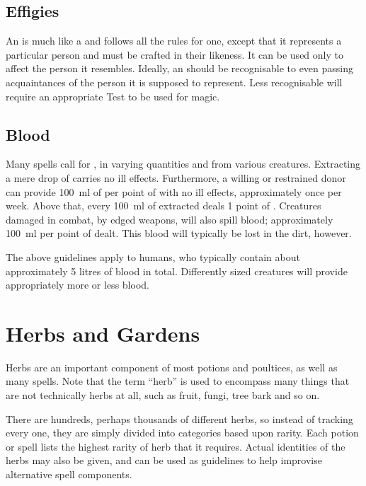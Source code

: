 \subsection{Effigies}

An  is much like a  and follows all the rules for one, except that it represents a particular person and must be crafted in their likeness.
It can be used only to affect the person it resembles.
Ideally, an  should be recognisable to even passing acquaintances of the person it is supposed to represent.
Less recognisable  will require an appropriate Test to be used for magic.

\subsection{Blood}

Many spells call for , in varying quantities and from various creatures.
Extracting a mere drop of  carries no ill effects.
Furthermore, a willing or restrained donor can provide \SI{100}{\milli\litre} of  per point of  with no ill effects, approximately once per week.
Above that, every \SI{100}{\milli\litre} of  extracted deals 1 point of {\damage}.
Creatures damaged in combat, by edged weapons, will also spill blood; approximately \SI{100}{\milli\litre} per point of {\damage} dealt.
This blood will typically be lost in the dirt, however.

The above guidelines apply to humans, who typically contain about approximately 5 litres of blood in total.
Differently sized creatures will provide appropriately more or less blood.


\section{Herbs and Gardens}

Herbs are an important component of most potions and poultices, as well as many spells.
Note that the term ``herb'' is used to encompass many things that are not technically herbs at all, such as fruit, fungi, tree bark and so on.

There are hundreds, perhaps thousands of different herbs, so instead of tracking every one, they are simply divided into categories based upon rarity.
Each potion or spell lists the highest rarity of herb that it requires.
Actual identities of the herbs may also be given, and can be used as guidelines to help improvise alternative spell components.

